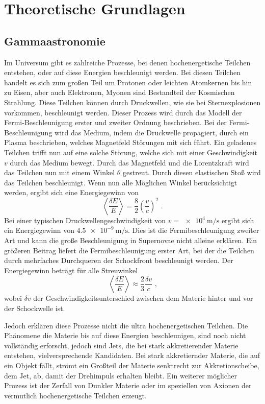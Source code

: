 \chapter{Theoretische Grundlagen}

\section{Gammaastronomie}

Im Universum gibt es zahlreiche Prozesse, bei denen hochenergetische Teilchen entstehen, oder auf diese Energien beschleunigt werden.
Bei diesen Teilchen handelt es sich zum großen Teil um Protonen oder leichten  Atomkernen bis hin zu Eisen, aber auch Elektronen, Myonen
sind Bestandteil der Kosmischen Strahlung.
Diese Teilchen können durch Druckwellen, wie sie bei Sternexplosionen vorkommen, beschleunigt werden. Dieser Prozess wird durch das
Modell der Fermi-Beschleunigung erster und zweiter Ordnung beschrieben. Bei der Fermi-Beschleunigung wird das Medium, indem die Druckwelle
propagiert, durch ein Plasma beschrieben, welches Magnetfeld Störungen mit sich führt. Ein geladenes Teilchen trifft nun auf eine
solche Störung, welche sich mit einer Geschwindigkeit $v$ durch das Medium bewegt. Durch das Magnetfeld und die Lorentzkraft wird
das Teilchen nun mit einem Winkel $\theta$ gestreut. Durch diesen elastischen Stoß wird das Teilchen beschleunigt. Wenn nun alle
Möglichen Winkel berücksichtigt werden, ergibt sich eine Energiegewinn von
\begin{equation*}
  \left\langle \frac{\delta E}{E} \right\rangle = \frac{8}{2}\left(\frac{v}{c}\right)^2\text{ .}
\end{equation*}
Bei einer typischen Druckwellengeschwindigkeit von $v=\SI{e4}{\m\per\s}$\cite[14]{HESS} ergibt sich ein Energiegewinn von
$\SI{4.5e-9}{\m\per\s}$. Dies ist die Fermibeschleunigung zweiter Art und kann die große Beschleunigung in Supernovae nicht alleine erklären.
Ein größeren Beitrag liefert die Fermibeschleunigung erster Art, bei der die Teilchen durch mehrfaches Durchqueren der Schockfront
beschleunigt werden. Der Energiegewinn beträgt für alle Streuwinkel
\begin{equation*}
  \left\langle \frac{\delta E}{E} \right\rangle \approx \frac{2}{3}\frac{\delta v}{c} \text{ ,}
\end{equation*}
wobei $\delta v$ der Geschwindigkeitsunterschied zwischen dem Materie hinter und vor der Schockwelle ist.

Jedoch erklären diese Prozesse nicht die ultra hochenergetischen Teilchen. Die Phänomene die Materie bis auf diese Energien beschleunigen,
sind noch nicht vollständig erforscht, jedoch sind Jets, die bei stark akkretierender Materie entstehen, vielversprechende Kandidaten.
Bei stark akkretiernder Materie, die auf ein Objekt fällt, strömt ein Großteil der Materie senktrecht zur Akkretionscheibe, dem Jet,
ab, damit der Drehimpuls erhalten bleibt.
Ein weiterer möglicher Prozess ist der Zerfall von Dunkler Materie oder im speziellen von Axionen der vermutlich hochenergetische
Teilchen erzeugt.

